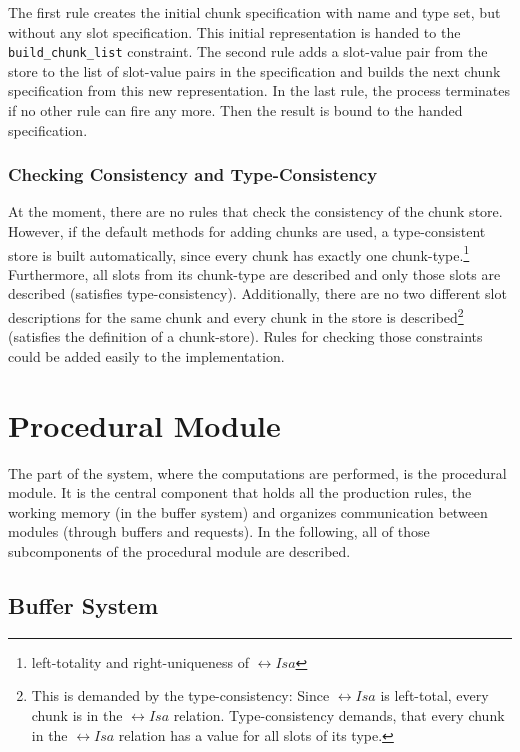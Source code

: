 The first rule creates the initial chunk specification with name and type set, but without any slot specification. This initial representation is handed to the \lstinline|build_chunk_list| constraint. The second rule adds a slot-value pair from the store to the list of slot-value pairs in the specification and builds the next chunk specification from this new representation. In the last rule, the process terminates if no other rule can fire any more. Then the result is bound to the handed specification.

\subsubsection{Checking Consistency and Type-Consistency}

At the moment, there are no rules that check the consistency of the chunk store. However, if the default methods for adding chunks are used, a type-consistent store is built automatically, since every chunk has exactly one chunk-type.\footnote{left-totality and right-uniqueness of $\rel{Isa}$} Furthermore, all slots from its chunk-type are described and only those slots are described (satisfies type-consistency). Additionally, there are no two different slot descriptions for the same chunk and every chunk in the store is described\footnote{This is demanded by the type-consistency: Since $\rel{Isa}$ is left-total, every chunk is in the $\rel{Isa}$ relation. Type-consistency demands, that every chunk in the $\rel{Isa}$ relation has a value for all slots of its type.} (satisfies the definition of a chunk-store). Rules for checking those constraints could be added easily to the implementation.

\section{Procedural Module}
\label{implementation:procedural_module}

The part of the system, where the computations are performed, is the procedural module. It is the central component that holds all the production rules, the working memory (in the buffer system) and organizes communication between modules (through buffers and requests). In the following, all of those subcomponents of the procedural module are described.

\subsection{Buffer System}
\label{implementation:buffer_system}

